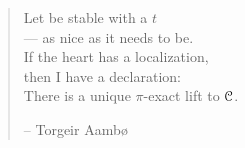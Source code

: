 


\vspace*{5cm}

\begin{verse}
    \hspace{2em}Let be stable with a $t$ \\
    \hspace{2em}--- as nice as it needs to be. \\
    \hspace{2em}If the heart has a localization, \\
    \hspace{2em}then I have a declaration: \\
    \hspace{2em}There is a unique $\pi$-exact lift to $\EuScript{C}$. 

    \hspace{\fill}-- Torgeir Aambø
\end{verse}